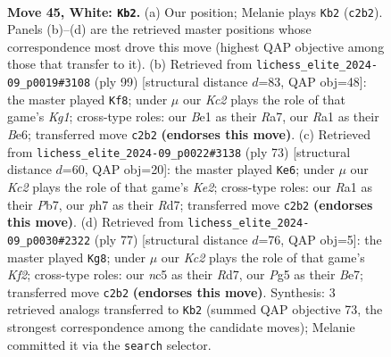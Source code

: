 \documentclass[11pt]{article}
\begin{document}
\clearpage

\begin{figure}[p]\centering
\begin{subfigure}{0.46\textwidth}\centering
\resizebox{\linewidth}{!}{%
\newchessgame
\chessboard[
  setfen={1rr5/6bp/p2p2k1/P1n1p1Pp/1pP1P3/1P3PR1/2K3B1/R3B3 w - - 4 45},
  showmover=false,
  pgfstyle=straightmove, color=movearrow, markmove={c2-b2}
]}
\caption{}
\end{subfigure}\hfill
\begin{subfigure}{0.46\textwidth}\centering
\resizebox{\linewidth}{!}{%
\newchessgame
\chessboard[
  setfen={6k1/r5p1/1p1rbpPp/1P1p3R/P1pPpP2/2N1P3/3K2P1/7R b - - 8 50},
  showmover=false,
  pgfstyle=straightmove, color=movearrow, markmove={g8-f8}
]}
\caption{}
\end{subfigure}
\\[4pt]
\begin{subfigure}{0.46\textwidth}\centering
\resizebox{\linewidth}{!}{%
\newchessgame
\chessboard[
  setfen={8/1p1rkp1r/p1pb2p1/4p2p/1PP1P2P/1PKN1RP1/4P3/5R2 b - - 0 37},
  showmover=false,
  pgfstyle=straightmove, color=movearrow, markmove={e7-e6}
]}
\caption{}
\end{subfigure}\hfill
\begin{subfigure}{0.46\textwidth}\centering
\resizebox{\linewidth}{!}{%
\newchessgame
\chessboard[
  setfen={2b5/2prbkp1/1pp5/p6r/P4R1p/1PP2N1P/5BPK/4R3 b - - 0 39},
  showmover=false,
  pgfstyle=straightmove, color=movearrow, markmove={f7-g8}
]}
\caption{}
\end{subfigure}
\caption{\textbf{Move 45, White: \texttt{Kb2}.} (a) Our position; Melanie plays \texttt{Kb2} (\texttt{c2b2}). Panels (b)--(d) are the retrieved master positions whose correspondence most drove this move (highest QAP objective among those that transfer to it). (b) Retrieved from \texttt{lichess\_elite\_2024-09\_p0019\#3108} (ply 99) [structural distance $d$=83, QAP obj=48]: the master played \texttt{Kf8}; under $\mu$ our \emph{Kc2} plays the role of that game's \emph{Kg1}; cross-type roles: our \emph{B}e1 as their \emph{R}a7, our \emph{R}a1 as their \emph{B}e6; transferred move \texttt{c2b2} \textbf{(endorses this move)}. (c) Retrieved from \texttt{lichess\_elite\_2024-09\_p0022\#3138} (ply 73) [structural distance $d$=60, QAP obj=20]: the master played \texttt{Ke6}; under $\mu$ our \emph{Kc2} plays the role of that game's \emph{Ke2}; cross-type roles: our \emph{R}a1 as their \emph{P}b7, our \emph{p}h7 as their \emph{R}d7; transferred move \texttt{c2b2} \textbf{(endorses this move)}. (d) Retrieved from \texttt{lichess\_elite\_2024-09\_p0030\#2322} (ply 77) [structural distance $d$=76, QAP obj=5]: the master played \texttt{Kg8}; under $\mu$ our \emph{Kc2} plays the role of that game's \emph{Kf2}; cross-type roles: our \emph{n}c5 as their \emph{R}d7, our \emph{P}g5 as their \emph{B}e7; transferred move \texttt{c2b2} \textbf{(endorses this move)}. Synthesis: 3 retrieved analogs transferred to \texttt{Kb2} (summed QAP objective 73, the strongest correspondence among the candidate moves); Melanie committed it via the \texttt{search} selector.}
\label{fig:thought-m88}
\end{figure}
\end{document}
